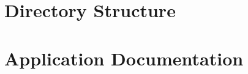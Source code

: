 \documentclass[11pt,twoside]{report}
\begin{document}
\chapter{Directory Structure}
\label{apx:dirstruct}

\chapter{Application Documentation}






\end{document}
